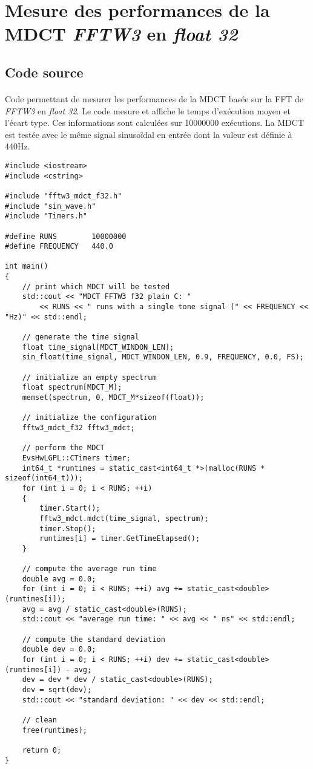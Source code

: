 \documentclass{article}
\begin{document}
\newpage
\section{Mesure des performances de la MDCT \emph{FFTW3} en \emph{float 32}}\label{app:perf_mdct_fftw3}
\subsection{Code source}\label{app:perf_mdct_fftw3_code}
\paragraph{}
Code permettant de mesurer les performances de la MDCT basée sur la FFT de \emph{FFTW3} en \emph{float 32}. Le code mesure et affiche le temps d'exécution moyen et l'écart type. Ces informations sont calculées sur \SI{10000000}{} exécutions. La MDCT est testée avec le même signal sinusoïdal en entrée dont la valeur est définie à 440Hz.
\lstset{language=C++}
\begin{lstlisting}
#include <iostream>
#include <cstring>

#include "fftw3_mdct_f32.h"
#include "sin_wave.h"
#include "Timers.h"

#define RUNS        10000000
#define FREQUENCY   440.0

int main()
{
    // print which MDCT will be tested
    std::cout << "MDCT FFTW3 f32 plain C: "
        << RUNS << " runs with a single tone signal (" << FREQUENCY << "Hz)" << std::endl;

    // generate the time signal
    float time_signal[MDCT_WINDON_LEN];
    sin_float(time_signal, MDCT_WINDON_LEN, 0.9, FREQUENCY, 0.0, FS);

    // initialize an empty spectrum
    float spectrum[MDCT_M];
    memset(spectrum, 0, MDCT_M*sizeof(float));

    // initialize the configuration
    fftw3_mdct_f32 fftw3_mdct;

    // perform the MDCT
    EvsHwLGPL::CTimers timer;
    int64_t *runtimes = static_cast<int64_t *>(malloc(RUNS * sizeof(int64_t)));
    for (int i = 0; i < RUNS; ++i)
    {
        timer.Start();
        fftw3_mdct.mdct(time_signal, spectrum);
        timer.Stop();
        runtimes[i] = timer.GetTimeElapsed();
    }

    // compute the average run time
    double avg = 0.0;
    for (int i = 0; i < RUNS; ++i) avg += static_cast<double>(runtimes[i]);
    avg = avg / static_cast<double>(RUNS);
    std::cout << "average run time: " << avg << " ns" << std::endl;

    // compute the standard deviation
    double dev = 0.0;
    for (int i = 0; i < RUNS; ++i) dev += static_cast<double>(runtimes[i]) - avg;
    dev = dev * dev / static_cast<double>(RUNS);
    dev = sqrt(dev);
    std::cout << "standard deviation: " << dev << std::endl;

    // clean
    free(runtimes);

    return 0;
}
\end{lstlisting}
\end{document}
